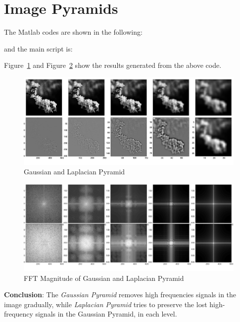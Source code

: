 \documentclass[11pt]{article}
\begin{document}
\section{Image Pyramids}
The Matlab codes are shown in the following:



and the main script is:


Figure~\ref{fig:pyramid} and Figure~\ref{fig:fft} show the results generated from the above code.

\begin{figure}[h]
\centering
\includegraphics[width=0.95\linewidth]{./img/pyramid.png}
\caption{Gaussian and Laplacian Pyramid}
\label{fig:pyramid}
\end{figure}

\begin{figure}[h]
\centering
\includegraphics[width=0.95\linewidth]{./img/fft_mag_pyramid.png}
\caption{FFT Magnitude of Gaussian and Laplacian Pyramid}
\label{fig:fft}
\end{figure}

\textbf{Conclusion}: The \emph{Gaussian Pyramid} removes high frequencies signals in the image gradually, while \emph{Laplacian Pyramid} tries to preserve the lost high-frequency signals in the Gaussian Pyramid, in each level.
\end{document}
